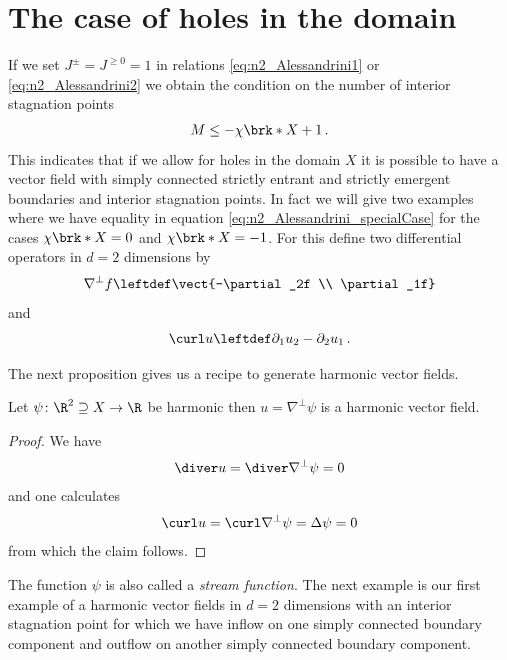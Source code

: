 \section{The case of holes in the domain}

If we set $J^\pm=J^{\geq0}=1$ in relations \eqref{eq:n2_Alessandrini1} or \eqref{eq:n2_Alessandrini2}
we obtain the condition on the number of interior stagnation points
\begin{align}
  M\leq-\chi\brk*{X}+1\,.\label{eq:n2_Alessandrini_specialCase}
\end{align}
This indicates that if we allow for holes in the domain $X$ it is possible to have a vector field with simply
connected strictly entrant and strictly emergent boundaries  and interior stagnation points.
In fact we will give two examples where we have equality in equation \eqref{eq:n2_Alessandrini_specialCase}
for the cases $\chi\brk*{X}=0$ and $\chi\brk*{X}=-1$.
For this define two differential operators in $d=2$ dimensions by
\begin{align}
  \nabla^\perp f\leftdef\vect{-\partial_2f \\ \partial_1f}\label{eq:n2_nablaPerp}
\end{align}
and
\begin{align}
  \curl u\leftdef\partial_1u_2-\partial_2u_1\,.\label{eq:n2_curl}
\end{align}

The next proposition gives us a recipe to generate harmonic vector fields.
\begin{proposition}
  Let $\psi\colon\R^2\supseteq X\to\R$ be harmonic then $u=\nabla^\perp\psi$ is a harmonic vector field.
\end{proposition} 
\begin{proof}
  We have
  \begin{align*}
    \diver u = \diver\nabla^\perp \psi=0
  \end{align*}
  and one calculates
  \begin{align*}
    \curl u = \curl\nabla^\perp \psi = \Delta \psi = 0
  \end{align*}
  from which the claim follows.
\end{proof}
The function $\psi$ is also called a \emph{stream function}.
The next example is our first example of a harmonic vector fields
in $d=2$ dimensions with an interior stagnation point for which 
we have inflow on one simply connected boundary component and outflow on another simply connected boundary
component.

